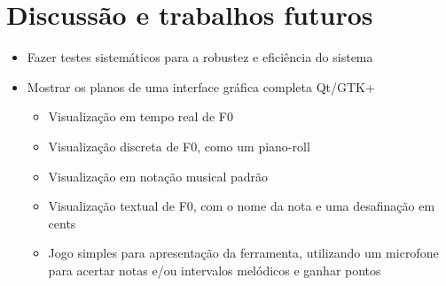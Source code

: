 \section{Discussão e trabalhos futuros}
\label{sec:discussao}

\begin{itemize}
\item Fazer testes sistemáticos para a robustez e eficiência do sistema
\item Mostrar os planos de uma interface gráfica completa Qt/GTK+
\begin{itemize}
	\item Visualização em tempo real de F0
	\item Visualização discreta de F0, como um piano-roll
	\item Visualização em notação musical padrão
	\item Visualização textual de F0, com o nome da nota e uma desafinação em cents
	\item Jogo simples para apresentação da ferramenta, utilizando um microfone para acertar notas e/ou intervalos melódicos e ganhar pontos
	\end{itemize}
\end{itemize}
